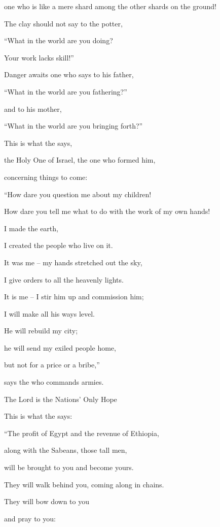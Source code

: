 {\par }{\Q one who is like a mere shard
among the
other shards
on the ground!
\par }{\Q The clay
should not
say
to the potter,
\par }{\Q “What
in the world are
you doing?
\par }{\Q Your work
lacks skill!”
\par }{\Q {}Danger awaits
one who says
to his father,
\par }{\Q “What
in the world are you fathering?”
\par }{\Q and to his mother,
\par }{\Q “What
in the world are you bringing forth?”
\par }{\Q {}This is what
the {}
says,
\par }{\Q the Holy One
of Israel,
the one who formed
him,
\par }{\Q concerning things to come:

\par }{\Q “How dare you question
me about
my children!
\par }{\Q How dare
you tell
me what to do
with the work
of my own hands!
\par }{\Q {}I
made
the earth,
\par }{\Q I created
the people
who live on
it.
\par }{\Q It was me
– my hands
stretched
out the sky,
\par }{\Q I give orders
to all
the heavenly
lights.
\par }{\Q {}It is me – I stir him up and commission him;
\par }{\Q I will make all his ways level.
\par }{\Q He will rebuild my city;
\par }{\Q he will send my exiled people home,
\par }{\Q but not for a price or a bribe,”
\par }{\Q says the
{} who commands armies.
\par }{\SH The Lord is the Nations’ Only Hope
\par }{\Q {}This is what
the
{}
says:
\par }{\Q “The profit
of Egypt
and the revenue
of Ethiopia,
\par }{\Q along with the Sabeans,
those tall men,
\par }{\Q will be brought to you and become
yours.
\par }{\Q They will walk
behind
you, coming along in chains.
\par }{\Q They will bow
down to
you
\par }{\Q and pray
to
you:

}
